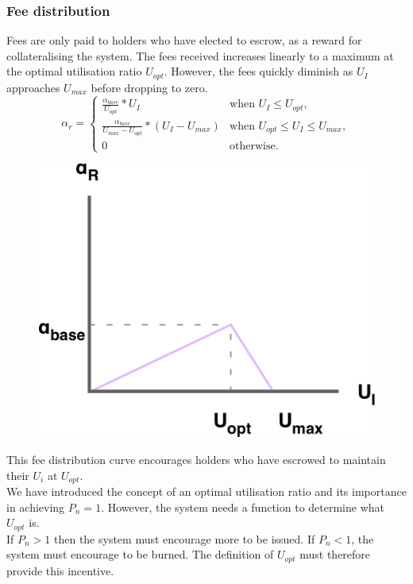 \newpage
\subsubsection{Fee distribution}

\noindent Fees are only paid to \HAV{} holders who have elected to escrow, as a reward for collateralising the system. The fees received increases linearly to a maximum at the optimal utilisation ratio $U_{opt}$. However, the fees quickly diminish as $U_I$ approaches $U_{max}$ before dropping to zero. \\

\[
\alpha_r = 
\begin{cases}
 \frac{\alpha_{base}}{U_{opt}} * U_I &\mbox{when } U_I \leq U_{opt}, \\ 
 \frac{\alpha_{base}}{U_{max} - U_{opt}} * (U_I  - U_{max}) &\mbox{when } U_{opt} \leq U_I \leq U_{max}, \\ 
 0 &\mbox{otherwise}.
 \end{cases}
\]

\begin{figure}[h!]
    \centering
    \includegraphics[width=.55\textwidth]{img/fees-received}
\end{figure}

\noindent This fee distribution curve encourages \HAV{} holders who have escrowed to maintain their $U_i$ at $U_{opt}$.  \\

\noindent We have introduced the concept of an optimal utilisation ratio and its importance in achieving $P_n = 1$. However, the system needs a function to determine what $U_{opt}$ is. \\

\noindent If $P_n > 1$ then the system must encourage more \NOM{} to be issued. If $P_n < 1$, the system must encourage \NOM{} to be burned. The definition of $U_{opt}$ must therefore provide this incentive.

